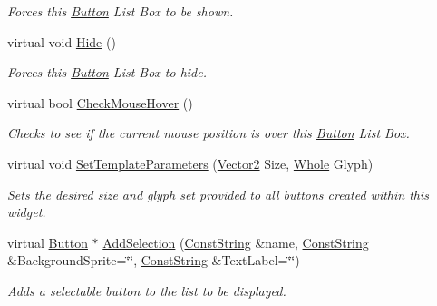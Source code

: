 \begin{DoxyCompactItemize}
\begin{DoxyCompactList}\small\item\em Forces this \hyperlink{classphys_1_1UI_1_1Button}{Button} List Box to be shown. \item\end{DoxyCompactList}\item 
\hypertarget{classphys_1_1UI_1_1ButtonListBox_a679eaa7b269f5fa20db2c1bff6bc2d3b}{
virtual void \hyperlink{classphys_1_1UI_1_1ButtonListBox_a679eaa7b269f5fa20db2c1bff6bc2d3b}{Hide} ()}
\label{d4/dd7/classphys_1_1UI_1_1ButtonListBox_a679eaa7b269f5fa20db2c1bff6bc2d3b}

\begin{DoxyCompactList}\small\item\em Forces this \hyperlink{classphys_1_1UI_1_1Button}{Button} List Box to hide. \item\end{DoxyCompactList}\item 
virtual bool \hyperlink{classphys_1_1UI_1_1ButtonListBox_aaa8b11b174a0475cadee3d3349ef1a58}{CheckMouseHover} ()
\begin{DoxyCompactList}\small\item\em Checks to see if the current mouse position is over this \hyperlink{classphys_1_1UI_1_1Button}{Button} List Box. \item\end{DoxyCompactList}\item 
virtual void \hyperlink{classphys_1_1UI_1_1ButtonListBox_adafec2d6141603bcfe6002e217fa476f}{SetTemplateParameters} (\hyperlink{classphys_1_1Vector2}{Vector2} Size, \hyperlink{namespacephys_a460f6bc24c8dd347b05e0366ae34f34a}{Whole} Glyph)
\begin{DoxyCompactList}\small\item\em Sets the desired size and glyph set provided to all buttons created within this widget. \item\end{DoxyCompactList}\item 
virtual \hyperlink{classphys_1_1UI_1_1Button}{Button} $\ast$ \hyperlink{classphys_1_1UI_1_1ButtonListBox_afc976097cd2b1a039882e07272f9a464}{AddSelection} (\hyperlink{namespacephys_a5ce5049f8b4bf88d6413c47b504ebb31}{ConstString} \&name, \hyperlink{namespacephys_a5ce5049f8b4bf88d6413c47b504ebb31}{ConstString} \&BackgroundSprite=\char`\"{}\char`\"{}, \hyperlink{namespacephys_a5ce5049f8b4bf88d6413c47b504ebb31}{ConstString} \&TextLabel=\char`\"{}\char`\"{})
\begin{DoxyCompactList}\small\item\em Adds a selectable button to the list to be displayed. \item\end{DoxyCompactList}\item 

\end{DoxyCompactItemize}
